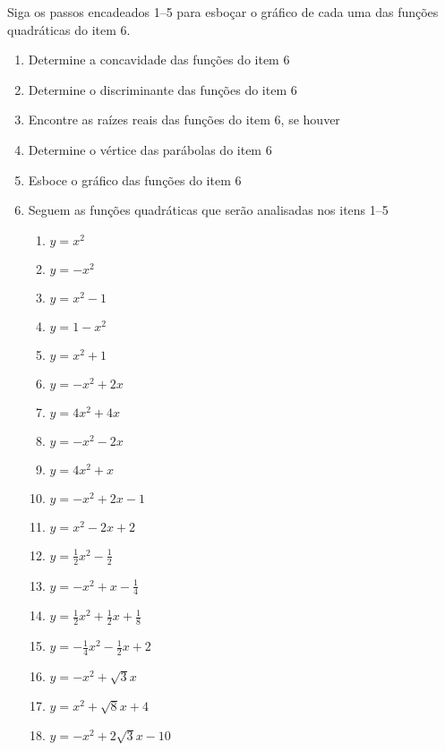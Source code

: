 \documentclass[a4paper]{article}
\begin{document}
Siga os passos encadeados 1--5 para esboçar o gráfico de cada uma das
funções quadráticas do item 6.

\begin{enumerate}
\item Determine a concavidade das funções do item 6
\item Determine o discriminante das funções do item 6
\item Encontre as raízes reais das funções do item 6, se houver
\item Determine o vértice das parábolas do item 6
\item Esboce o gráfico das funções do item 6
\item Seguem as funções quadráticas que serão analisadas nos itens
  1--5

  \begin{multicols}{2}
    
  \begin{enumerate}
  \item $y = x^2$
  \item $y = -x^2$
  \item $y = x^2 -1$
  \item $y = 1 - x^2$
  \item $y = x^2 + 1$
  \item $y = -x^2 + 2x$
  \item $y = 4x^2 + 4x$
  \item $y = -x^2 - 2x$
  \item $y = 4x^2 +x$
  \item $y = -x^2 +2x - 1$
  \item $y = x^2 -2x + 2$
  \item $y = \frac{1}{2}x^2 - \frac{1}{2}$
  \item $y = -x^2 +x - \frac{1}{4}$
  \item $y = \frac{1}{2}x^2 + \frac{1}{2}x + \frac{1}{8}$
  \item $y = -\frac{1}{4}x^2 -\frac{1}{2}x +2$
  \item $y = -x^2 + \sqrt{3}x$
  \item $y = x^2 + \sqrt{8}x + 4$
  \item $y = -x^2 + 2\sqrt{3}x - 10$
  \end{enumerate}

\end{multicols}

\end{enumerate}
\end{document}
